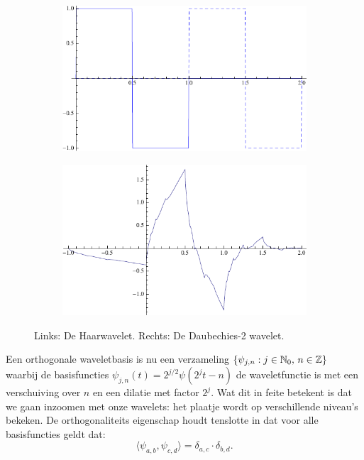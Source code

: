 \begin{figure}[h]
  \centering
  \begin{subfigure}{0.48\linewidth}
    \includegraphics[width=\linewidth]{plaatjes/db1.pdf}
  \end{subfigure}
  \begin{subfigure}{0.48\linewidth}
    \includegraphics[width=\linewidth]{plaatjes/db2_psi.pdf}
  \end{subfigure}
  \caption{Links: De Haarwavelet. Rechts: De Daubechies-2 wavelet.}
\label{fig:samenv}
\end{figure}

Een orthogonale waveletbasis is nu een verzameling $\{ \psi_{j,n}: j \in \mathbb{N}_0,\, n \in \mathbb{Z} \}$ waarbij de basisfuncties \mbox{$\psi_{j,n}(t) = 2^{j/2} \psi(2^jt - n)$} de waveletfunctie is met een verschuiving over $n$ en een dilatie met factor $2^j$. Wat dit in feite betekent is dat we gaan inzoomen met onze wavelets: het plaatje wordt op verschillende niveau's bekeken. De orthogonaliteits eigenschap houdt tenslotte in dat voor alle basisfuncties geldt dat: \[\langle \psi_{a,b}, \psi_{c,d} \rangle = \delta_{a,c} \cdot \delta_{b,d}.\]

